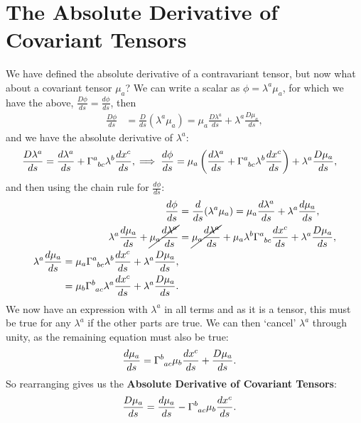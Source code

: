 \documentclass[a4paper, 11pt, normalem]{report}
\begin{document}
\section{The Absolute Derivative of Covariant Tensors}
We have defined the absolute derivative of a contravariant tensor, but now what about a covariant tensor $\mu_a$?
We can write a scalar as $\phi=\lambda^a\mu_a$, for which we have the above, $\frac{D\phi}{ds} = \frac{d\phi}{ds}$, then
\begin{align}
    \frac{D\phi}{ds} &= \frac{D}{ds}(\lambda^a\mu_a) = \mu_a\frac{D\lambda^a}{ds}+\lambda^a\frac{D\mu_a}{ds}, 
\end{align}
and we have the absolute derivative of $\lambda^a$:
\begin{align}
    \frac{D\lambda^a}{ds} &= \frac{d\lambda^a}{ds} + \tensor{\Gamma}{^a_{bc}}\lambda^b\frac{dx^c}{ds},
    \implies \frac{d\phi}{ds} = \mu_a\left(\frac{d\lambda^a}{ds} + \tensor{\Gamma}{^a_{bc}}\lambda^b\frac{dx^c}{ds}\right) + \lambda^a\frac{D\mu_a}{ds},
\end{align}
and then using the chain rule for $\frac{d\phi}{ds}$:
\begin{align}
    \frac{d\phi}{ds} &= \frac{d}{ds}(\lambda^a\mu_a) = \mu_a\frac{d\lambda^a}{ds}+\lambda^a\frac{d\mu_a}{ds}, \\
    \lambda^a\frac{d\mu_a}{ds} + \cancel{\mu_a\frac{d\lambda^a}{ds}} &= \cancel{\mu_a\frac{d\lambda^a}{ds}} + \mu_a\lambda^b\tensor{\Gamma}{^a_{bc}}\frac{dx^c}{ds} + \lambda^a\frac{D\mu_a}{ds},\\
    \begin{split}
        \lambda^a\frac{d\mu_a}{ds} &= \mu_a\tensor{\Gamma}{^a_{bc}}\lambda^b\frac{dx^c}{ds} + \lambda^a\frac{D\mu_a}{ds}, \\
                                   &= \mu_b\tensor{\Gamma}{^b_{ac}}\lambda^a\frac{dx^c}{ds} + \lambda^a\frac{D\mu_a}{ds}.
    \end{split}
\end{align}
We now have an expression with $\lambda^a$ in all terms and as it is a tensor, this must be true for any $\lambda^a$ if the other parts are true. 
We can then `cancel' $\lambda^a$ through unity, as the remaining equation must also be true:
\begin{align}
    \frac{d\mu_a}{ds} &= \tensor{\Gamma}{^b_{ac}}\mu_b\frac{dx^c}{ds} + \frac{D\mu_a}{ds}.
\end{align}
So rearranging gives us the \textbf{Absolute Derivative of Covariant Tensors}:
\begin{align}
    \frac{D\mu_a}{ds} &= \frac{d\mu_a}{ds} - \tensor{\Gamma}{^b_{ac}}\mu_b\frac{dx^c}{ds}.
\end{align}
\end{document}
